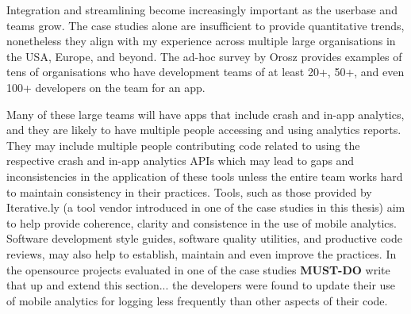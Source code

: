 Integration and streamlining become increasingly important as the userbase and teams grow. The case studies alone are insufficient to provide quantitative trends, nonetheless they align with my experience across multiple large organisations in the USA, Europe, and beyond. The ad-hoc survey by Orosz provides examples of tens of organisations who have development teams of at least 20+, 50+, and even 100+ developers on the team for an app.


Many of these large teams will have apps that include crash and in-app analytics, and they are likely to have multiple people accessing and using analytics reports. They may include multiple people contributing code related to using the respective crash and in-app analytics APIs which may lead to gaps and inconsistencies in the application of these tools unless the entire team works hard to maintain consistency in their practices. Tools, such as those provided by Iterative.ly (a tool vendor introduced in one of the case studies in this thesis) aim to help provide coherence, clarity and consistence in the use of mobile analytics. Software development style guides, software quality utilities, and productive code reviews, may also help to establish, maintain and even improve the practices. In the opensource projects evaluated in one of the case studies \textbf{MUST-DO} write that up and extend this section... the developers were found to update their use of mobile analytics for logging less frequently than other aspects of their code.


